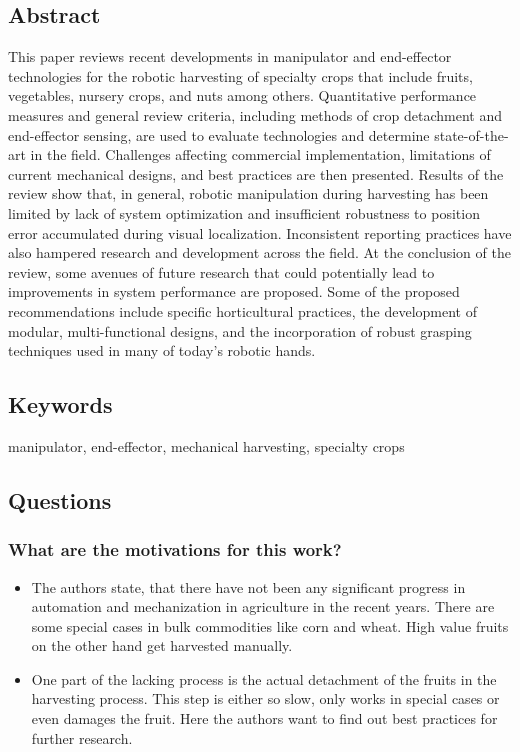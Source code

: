 \documentclass{article}
\begin{document}
\subsection*{Abstract}
This paper reviews recent developments in manipulator and end-effector technologies for the robotic
harvesting of specialty crops that include fruits, vegetables, nursery crops, and nuts among others.
Quantitative performance measures and general review criteria, including methods of crop detachment and
end-effector sensing, are used to evaluate technologies and determine state-of-the-art in the field. Challenges
affecting commercial implementation, limitations of current mechanical designs, and best practices are then
presented. Results of the review show that, in general, robotic manipulation during harvesting has been
limited by lack of system optimization and insufficient robustness to position error accumulated during
visual localization. Inconsistent reporting practices have also hampered research and development across
the field. At the conclusion of the review, some avenues of future research that could potentially lead to
improvements in system performance are proposed. Some of the proposed recommendations include
specific horticultural practices, the development of modular, multi-functional designs, and the incorporation
of robust grasping techniques used in many of today’s robotic hands.

\subsection*{Keywords}
manipulator, end-effector, mechanical harvesting, specialty crops

\subsection*{Questions}
\subsubsection*{What are the motivations for this work?}
\begin{itemize}
    \item The authors state, that there have not been any significant progress in automation and mechanization in agriculture in the recent years. There are some special cases in bulk commodities like corn and wheat. High value fruits on the other hand get harvested manually.
    \item One part of the lacking process is the actual detachment of the fruits in the harvesting process. This step is either so slow, only works in special cases or even damages the fruit. Here the authors want to find out best practices for further research.
\end{itemize}
\end{document}
